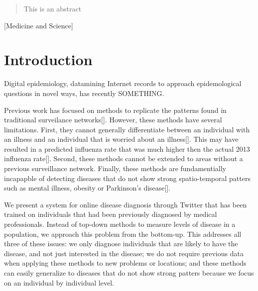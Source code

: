 \documentclass{acm_proc_article-sp}
\begin{document}
\maketitle
\begin{abstract}
This is an abstract
\end{abstract}

[Medicine and Science]



\section{Introduction}
Digital epidemiology, datamining Internet records to approach epidemological questions in novel ways, has recently SOMETHING.  

Previous work has focused on methods to replicate the patterns found in traditional surveilance networks[]. However, these methods have several limitations. First, they cannot generally differentiate between an individual with an illness and an individual that is worried about an illness[]. This may have resulted in a predicted influenza rate that was much higher then the actual 2013 influenza rate[]. Second, these methods cannot be extended to areas without a previous surveillance network. Finally, these methods are fundamentially incapapble of detecting diseases that do not show strong spatio-temporal patters such as mental illness, obesity or Parkinson's disease[]. 

We present a system for online disease diagnosis through Twitter that has been trained on individuals that had been previously diagnosed by medical professionals. Instead of top-down methods to measure levels of disease in a population, we approach this problem from the bottom-up. This addresses all three of these issues: we only diagnose individuals that are likely to have the disease, and not just interested in the disease; we do not require previous data when applying these methods to new problems or locations; and these methods can easily generalize to diseases that do not show strong patters because we focus on an individual by individual level.
\end{document}
